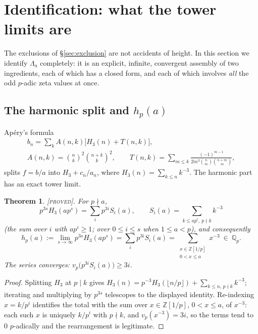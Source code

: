 \documentclass[11pt,reqno]{article}
\newcommand{\Qp}{\mathbb{Q}_p}
\newcommand{\ZZ}{\mathbb{Z}}
\newcommand{\vp}{v_p}
\newcommand{\bin}[2]{\binom{#1}{#2}}
\newcommand{\floor}[1]{\lfloor #1 \rfloor}
\newcommand{\PROVED}{{\normalfont\textsc{[proved]}}}
\theoremstyle{plain}
\newtheorem{theorem}{Theorem}[section]
\theoremstyle{definition}
\theoremstyle{remark}
\numberwithin{equation}{section}
\begin{document}
\section{Identification: what the tower limits are}\label{sec:identify}

The exclusions of \S\ref{sec:exclusion} are not accidents of height.  In this
section we identify $\Lambda_a$ completely: it is an explicit, infinite,
convergent assembly of two ingredients, each of which has a closed form, and
each of which involves \emph{all} the odd $p$-adic zeta values at once.

\subsection{The harmonic split and $h_p(a)$}\label{ss:hp}

Ap\'ery's formula
\begin{gather*}
  b_n=\sum_kA(n,k)\bigl[H_3(n)+T(n,k)\bigr],\\
  A(n,k)=\bin{n}{k}^2\bin{n+k}{k}^2,\qquad
  T(n,k)=\sum_{m\le k}\frac{(-1)^{m-1}}{2m^3\bin{n}{m}\bin{n+m}{m}},
\end{gather*}
splits $f=b/a$ into $H_3+c_n/a_n$, where $H_3(n)=\sum_{k\le n}k^{-3}$.  The
harmonic part has an exact tower limit.

\begin{theorem}\label{thm:hp}
\PROVED.  For $p\nmid a$,
\[
  p^{3s}H_3(ap^s)=\sum_{i}p^{3i}S_i(a),
  \qquad S_i(a)=\sum_{k\le ap^{i},\ p\nmid k}k^{-3}
\]
(the sum over $i$ with $ap^i\ge1$; over $0\le i\le s$ when $1\le a<p$), and
consequently
\[
  h_p(a):=\lim_{s\to\infty}p^{3s}H_3(ap^s)
  =\sum_{i}p^{3i}S_i(a)
  =\sum_{\substack{x\in\ZZ[1/p]\\ 0<x\le a}}x^{-3}\ \in\ \Qp .
\]
The series converges: $\vp\bigl(p^{3i}S_i(a)\bigr)\ge3i$.
\end{theorem}

\begin{proof}
Splitting $H_3$ at $p\mid k$ gives
$H_3(n)=p^{-3}H_3(\floor{n/p})+\sum_{k\le n,\,p\nmid k}k^{-3}$; iterating and
multiplying by $p^{3s}$ telescopes to the displayed identity.  Re-indexing
$x=k/p^{i}$ identifies the total with the sum over $x\in\ZZ[1/p]$, $0<x\le a$,
of $x^{-3}$: each such $x$ is uniquely $k/p^i$ with $p\nmid k$, and
$\vp(x^{-3})=3i$, so the terms tend to $0$ $p$-adically and the rearrangement is
legitimate.
\end{proof}
\end{document}

